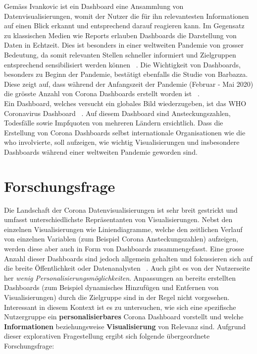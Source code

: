 \documentclass[12pt, oneside]{article}
\begin{document}
Gemäss Ivankovic ist ein Dashboard eine Ansammlung von Datenvisualisierungen, womit der Nutzer die für ihn relevantesten Informationen auf einen Blick erkannt und entsprechend darauf reagieren kann. Im Gegensatz zu klassischen Medien wie Reports erlauben Dashboards die Darstellung von Daten in Echtzeit. Dies ist besonders in einer weltweiten Pandemie von grosser Bedeutung, da somit relevanten Stellen schneller informiert und Zielgruppen entsprechend sensibilisiert werden können ~\citep[S. 2]{Ivankovic.2021}. Die Wichtigkeit von Dashboards, besonders zu Beginn der Pandemie, bestätigt ebenfalls die Studie von Barbazza. Diese zeigt auf, dass während der Anfangszeit der Pandemie (Februar - Mai 2020) die grösste Anzahl von Corona Dashboards erstellt worden ist ~\citep[S. 8]{Barbazza.2021}.\\

Ein Dashboard, welches versucht ein globales Bild wiederzugeben, ist das WHO Coronavirus Dashboard ~\citep{WHO.23.04.2022}. Auf diesem Dashboard sind Ansteckungszahlen, Todesfälle sowie Impfquoten von mehreren Ländern ersichtlich. Dass die Erstellung von Corona Dashboards selbst internationale Organisationen wie die \Gls{who} involvierte, soll aufzeigen, wie wichtig Visualisierungen und insbesondere Dashboards während einer weltweiten Pandemie geworden sind.
\clearpage

\section{Forschungsfrage}
Die Landschaft der Corona Datenvisualisierungen ist sehr breit gestrickt und umfasst unterschiedlichste Repräsentanten von Visualisierungen. Nebst den einzelnen Visualisierungen wie Liniendiagramme, welche den zeitlichen Verlauf von einzelnen Variablen (zum Beispiel Corona Ansteckungszahlen) aufzeigen, werden diese aber auch in Form von Dashboards zusammengefasst. Eine grosse Anzahl dieser Dashboards sind jedoch allgemein gehalten und fokussieren sich auf die breite Öffentlichkeit oder Datenanalysten ~\citep[S. 14]{Barbazza.2021}. Auch gibt es von der Nutzerseite her \textit{wenig Personalisierungsmöglichkeiten}. Anpassungen an bereits erstellten Dashboards (zum Beispiel dynamisches Hinzufügen und Entfernen von Visualisierungen) durch die Zielgruppe sind in der Regel nicht vorgesehen. Interessant in diesem Kontext ist es zu untersuchen, wie sich eine spezifische Nutzergruppe ein \textbf{personalisierbares} Corona Dashboard vorstellt und welche \textbf{Informationen} beziehungsweise \textbf{Visualisierung} von Relevanz sind. Aufgrund dieser explorativen Fragestellung ergibt sich folgende übergeordnete Forschungsfrage:
\end{document}
